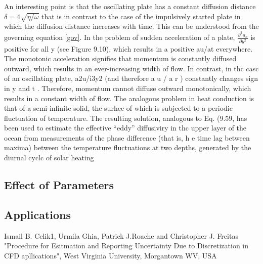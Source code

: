 \documentclass[paper=a4, fontsize=12pt, abstract=on]{scrartcl}
\numberwithin{equation}{section}		%
\numberwithin{figure}{section}			%
\numberwithin{table}{section}				%
\begin{document}
An interesting point is that the oscillating plate has a constant diffusion distance $\delta = 4\sqrt{\eta/\omega}$ that is in contrast to the case of the impulsively started plate in which the diffusion distance increases with time. This can be understood from
the governing equation \ref{gov}. In the problem of sudden acceleration of a plate,
$\frac{\partial^2 u_x}{\partial y^2}$ is positive for all y (see Figure 9.10), which results in a positive au/at
everywhere. The monotonic acceleration signifies that momentum is constantly
diffused outward, which results in an ever-increasing width of flow. In contrast,
in thc casc of an oscillating plate, a2u/i3y2 (and therefore a u / a r ) constantly
changes sign in y and t . Therefore, momentum cannot diffuse outward monotonically,
which results in a constant width of flow.
The analogous problem in heat conduction is that of a semi-infinite solid, the
surhce of which is subjected to a periodic fluctuation of temperature. The resulting
solution, analogous to Eq. (9.59, has been used to estimate the effective “eddy”
diffusiviry in thc upper layer of the ocean from measurements of the phase difference
(that is, h e time lag between maxima) between the temperature fluctuations at two
depths, generated by the diurnal cyclc of solar heating

\subsection{Effect of Parameters}

\subsection{Applications}





\begin{thebibliography}{99} %
Ismail B. Celik1, Urmila Ghia, Patrick J.Roache and Christopher J. Freitas
\newblock "Procedure for Esitmation and Reporting Uncertainty Due to Discretization in CFD apllications",  West Virginia University, Morgantown WV, USA

\end{thebibliography}


\end{document}
